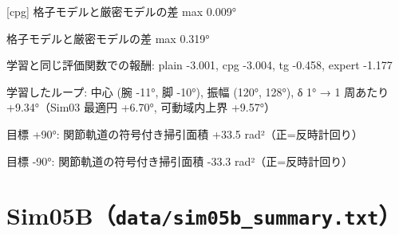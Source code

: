 {[cpg] 格子モデルと厳密モデルの差 max 0.009°\par
[tg] 格子モデルと厳密モデルの差 max 0.319°\par
学習と同じ評価関数での報酬: plain -3.001, cpg -3.004, tg -0.458, expert -1.177\par
[tg] 学習したループ: 中心 (腕 -11°, 脚 -10°), 振幅 (120°, 128°), δ 1° → 1 周あたり +9.34°（Sim03 最適円 +6.70°, 可動域内上界 +9.57°）\par
[tg] 目標 +90°: 関節軌道の符号付き掃引面積 +33.5 rad²（正=反時計回り）\par
[tg] 目標 -90°: 関節軌道の符号付き掃引面積 -33.3 rad²（正=反時計回り）\par
}

\section{Sim05B（\texttt{data/sim05b\_summary.txt}）}
